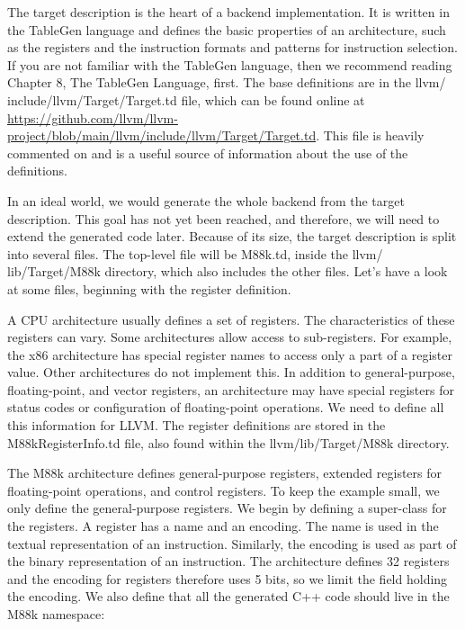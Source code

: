 
The target description is the heart of a backend implementation. It is written in the TableGen language and defines the basic properties of an architecture, such as the registers and the instruction formats and patterns for instruction selection. If you are not familiar with the TableGen language, then we recommend reading Chapter 8, The TableGen Language, first. The base definitions are in the llvm/ include/llvm/Target/Target.td file, which can be found online at \url{https://github.com/llvm/llvm-project/blob/main/llvm/include/llvm/Target/Target.td}. This file is heavily commented on and is a useful source of information about the use of the definitions.

In an ideal world, we would generate the whole backend from the target description. This goal has not yet been reached, and therefore, we will need to extend the generated code later. Because of its size, the target description is split into several files. The top-level file will be M88k.td, inside the llvm/ lib/Target/M88k directory, which also includes the other files. Let’s have a look at some files, beginning with the register definition.


A CPU architecture usually defines a set of registers. The characteristics of these registers can vary. Some architectures allow access to sub-registers. For example, the x86 architecture has special register names to access only a part of a register value. Other architectures do not implement this. In addition to general-purpose, floating-point, and vector registers, an architecture may have special registers for status codes or configuration of floating-point operations. We need to define all this information for LLVM. The register definitions are stored in the M88kRegisterInfo.td file, also found within the llvm/lib/Target/M88k directory.

The M88k architecture defines general-purpose registers, extended registers for floating-point operations, and control registers. To keep the example small, we only define the general-purpose registers. We begin by defining a super-class for the registers. A register has a name and an encoding. The name is used in the textual representation of an instruction. Similarly, the encoding is used as part of the binary representation of an instruction. The architecture defines 32 registers and the encoding for registers therefore uses 5 bits, so we limit the field holding the encoding. We also define that all the generated C++ code should live in the M88k namespace:


